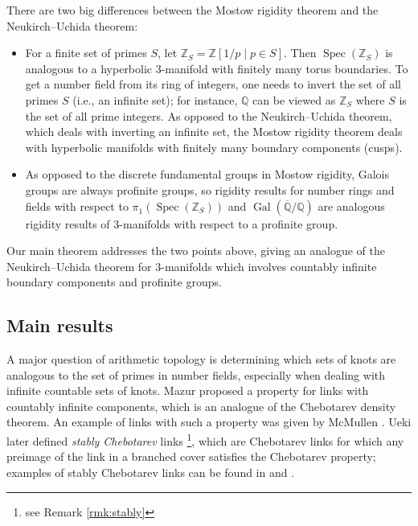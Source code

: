 \documentclass{amsart}
\theoremstyle{plain}
\theoremstyle{definition}
\theoremstyle{plain}
\theoremstyle{plain}
\theoremstyle{plain}
\theoremstyle{remark}
\theoremstyle{remark}
\theoremstyle{plain}
\theoremstyle{definition}
\theoremstyle{plain}
\DeclareMathOperator{\Gal}{\mathrm{Gal}}
\DeclareMathOperator{\Spec}{\mathrm{Spec}}
\DeclareMathOperator{\et}{\acute et}
\newcounter{main}
\theoremstyle{plain}
\theoremstyle{plain}
\numberwithin{equation}{section}
\begin{document}
There are two big differences between the Mostow rigidity theorem and the Neukirch--Uchida theorem:
\begin{itemize}
    \item For a finite set of primes $S$, let $\mathbb{Z}_S = \mathbb{Z}[1/p\mid p\in S]$. Then $\Spec(\mathbb{Z}_S)$ is analogous to a hyperbolic 3-manifold with finitely many torus boundaries. To get a number field from its ring of integers, one needs to invert the set of all primes $S$ (i.e., an infinite set); for instance, $\mathbb{Q}$ can be viewed as $\mathbb{Z}_S$ where $S$ is the set of all prime integers. As opposed to the Neukirch--Uchida theorem, which deals with inverting an infinite set, the Mostow rigidity theorem deals with hyperbolic manifolds with finitely many boundary components (cusps).
    \item As opposed to the discrete fundamental groups in Mostow rigidity, Galois groups are always profinite groups, so rigidity results for number rings and fields with respect to $\pi_1^{\et}(\Spec(\mathbb{Z}_S))$ and $\Gal(\overline{\mathbb{Q}}/\mathbb{Q})$ are analogous rigidity results of 3-manifolds with respect to a profinite group.
\end{itemize}

Our main theorem addresses the two points above, giving an analogue of the Neukirch--Uchida theorem for 3-manifolds which involves countably infinite boundary components and profinite groups.

\subsection{Main results}

A major question of arithmetic topology is determining which sets of knots are analogous to the set of primes in number fields, especially when dealing with infinite countable sets of knots. Mazur \cite{mazur} proposed a property for links with countably infinite components, which is an analogue of the Chebotarev density theorem. An example of links with such a property was given by McMullen \cite{mcmullen2013knots}. Ueki \cite{ueki2021chebotarev} later defined \emph{stably Chebotarev} links \footnote{see Remark \ref{rmk:stably}}, which are Chebotarev links for which any preimage of the link in a branched cover satisfies the Chebotarev property; examples of stably Chebotarev links can be found in \cite{mcmullen2013knots} and \cite{ueki2021chebotarev}. 

\medskip
\end{document}
